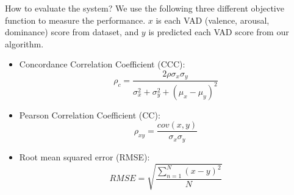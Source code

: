 \documentclass{beamer}
\begin{document}
\begin{frame}[t, fragile]{How to evaluate the system?}
We use the following three different objective function to measure the performance.
$x$ is each VAD (valence, arousal, dominance) score from dataset, 
and $y$ is predicted each VAD score from our algorithm.

\begin{itemize}
\item Concordance Correlation Coefficient (CCC): 
\begin{equation}
	\rho_c = \dfrac{2\rho \sigma_x \sigma_y}
			{\sigma_x^2 + \sigma_y^2 + (\mu_x - \mu_y)^2}
\label{eq:ccc}
\end{equation}
\item Pearson Correlation Coefficient (CC):
\begin{equation}
    \rho_{xy} = \dfrac {cov(x, y)}{\sigma_x \sigma_y}
    \label{eq:cc}
\end{equation}
\item Root mean squared error (RMSE):
\begin{equation}
    RMSE = \sqrt{\dfrac{\sum_{n=1}^{N} (x-y)^2}{N}}
\label{eq:rmse}
\end{equation}
\end{itemize}
\end{frame}

\end{document}
